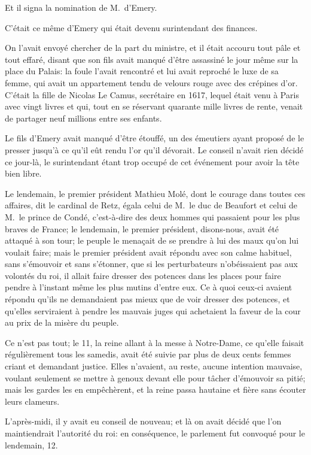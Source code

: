 Et il signa la nomination de M.~d'Emery.

C'était ce même d'Emery qui était devenu surintendant des finances.

On l'avait envoyé chercher de la part du ministre, et il était accouru tout pâle et tout effaré, disant que son fils avait manqué d'être assassiné le jour même sur la place du Palais: la foule l'avait rencontré et lui avait reproché le luxe de sa femme, qui avait un appartement tendu de velours rouge avec des crépines d'or. C'était la fille de Nicolas Le Camus, secrétaire en 1617, lequel était venu à Paris avec vingt livres et qui, tout en se réservant quarante mille livres de rente, venait de partager neuf millions entre ses enfants.

Le fils d'Emery avait manqué d'être étouffé, un des émeutiers ayant proposé de le presser jusqu'à ce qu'il eût rendu l'or qu'il dévorait. Le conseil n'avait rien décidé ce jour-là, le surintendant étant trop occupé de cet événement pour avoir la tête bien libre.

Le lendemain, le premier président Mathieu Molé, dont le courage dans toutes ces affaires, dit le cardinal de Retz, égala celui de M.~le duc de Beaufort et celui de M.~le prince de Condé, c'est-à-dire des deux hommes qui passaient pour les plus braves de France; le lendemain, le premier président, disons-nous, avait été attaqué à son tour; le peuple le menaçait de se prendre à lui des maux qu'on lui voulait faire; mais le premier président avait répondu avec son calme habituel, sans s'émouvoir et sans s'étonner, que si les perturbateurs n'obéissaient pas aux volontés du roi, il allait faire dresser des potences dans les places pour faire pendre à l'instant même les plus mutins d'entre eux. Ce à quoi ceux-ci avaient répondu qu'ils ne demandaient pas mieux que de voir dresser des potences, et qu'elles serviraient à pendre les mauvais juges qui achetaient la faveur de la cour au prix de la misère du peuple.

Ce n'est pas tout; le 11, la reine allant à la messe à Notre-Dame, ce qu'elle faisait régulièrement tous les samedis, avait été suivie par plus de deux cents femmes criant et demandant justice. Elles n'avaient, au reste, aucune intention mauvaise, voulant seulement se mettre à genoux devant elle pour tâcher d'émouvoir sa pitié; mais les gardes les en empêchèrent, et la reine passa hautaine et fière sans écouter leurs clameurs.

L'après-midi, il y avait eu conseil de nouveau; et là on avait décidé que l'on maintiendrait l'autorité du roi: en conséquence, le parlement fut convoqué pour le lendemain, 12.

